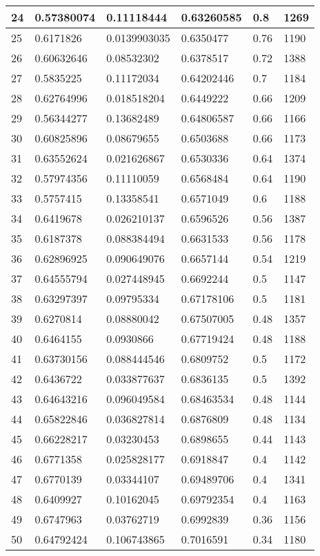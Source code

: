 \begin{longtable}{|l|l|l|l|l|l|}
24 & 0.57380074 & 0.11118444 & 0.63260585 & 0.8 & 1269 \\ \hline 
25 & 0.6171826 & 0.0139903035 & 0.6350477 & 0.76 & 1190 \\ \hline 
26 & 0.60632646 & 0.08532302 & 0.6378517 & 0.72 & 1388 \\ \hline 
27 & 0.5835225 & 0.11172034 & 0.64202446 & 0.7 & 1184 \\ \hline 
28 & 0.62764996 & 0.018518204 & 0.6449222 & 0.66 & 1209 \\ \hline 
29 & 0.56344277 & 0.13682489 & 0.64806587 & 0.66 & 1166 \\ \hline 
30 & 0.60825896 & 0.08679655 & 0.6503688 & 0.66 & 1173 \\ \hline 
31 & 0.63552624 & 0.021626867 & 0.6530336 & 0.64 & 1374 \\ \hline 
32 & 0.57974356 & 0.11110059 & 0.6568484 & 0.64 & 1190 \\ \hline 
33 & 0.5757415 & 0.13358541 & 0.6571049 & 0.6 & 1188 \\ \hline 
34 & 0.6419678 & 0.026210137 & 0.6596526 & 0.56 & 1387 \\ \hline 
35 & 0.6187378 & 0.088384494 & 0.6631533 & 0.56 & 1178 \\ \hline 
36 & 0.62896925 & 0.090649076 & 0.6657144 & 0.54 & 1219 \\ \hline 
37 & 0.64555794 & 0.027448945 & 0.6692244 & 0.5 & 1147 \\ \hline 
38 & 0.63297397 & 0.09795334 & 0.67178106 & 0.5 & 1181 \\ \hline 
39 & 0.6270814 & 0.08880042 & 0.67507005 & 0.48 & 1357 \\ \hline 
40 & 0.6464155 & 0.0930866 & 0.67719424 & 0.48 & 1188 \\ \hline 
41 & 0.63730156 & 0.088444546 & 0.6809752 & 0.5 & 1172 \\ \hline 
42 & 0.6436722 & 0.033877637 & 0.6836135 & 0.5 & 1392 \\ \hline 
43 & 0.64643216 & 0.096049584 & 0.68463534 & 0.48 & 1144 \\ \hline 
44 & 0.65822846 & 0.036827814 & 0.6876809 & 0.48 & 1134 \\ \hline 
45 & 0.66228217 & 0.03230453 & 0.6898655 & 0.44 & 1143 \\ \hline 
46 & 0.6771358 & 0.025828177 & 0.6918847 & 0.4 & 1142 \\ \hline 
47 & 0.6770139 & 0.03344107 & 0.69489706 & 0.4 & 1341 \\ \hline 
48 & 0.6409927 & 0.10162045 & 0.69792354 & 0.4 & 1163 \\ \hline 
49 & 0.6747963 & 0.03762719 & 0.6992839 & 0.36 & 1156 \\ \hline 
50 & 0.64792424 & 0.106743865 & 0.7016591 & 0.34 & 1180 \\ \hline 
\end{longtable}
